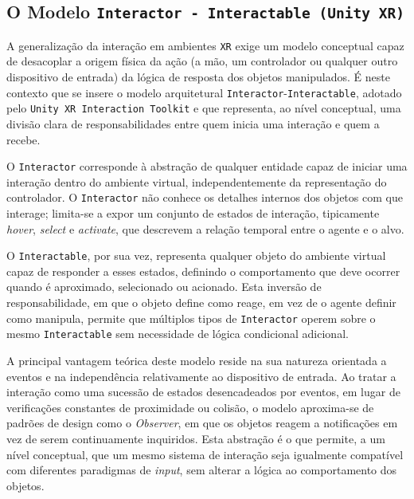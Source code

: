 \documentclass[a4paper, 12pt]{book}
\begin{document}
\subsection{O Modelo \texttt{Interactor - Interactable (Unity XR)}}
\label{subsec:interactor_interactable}
A generalização da interação em ambientes \texttt{XR} exige um modelo 
conceptual capaz de desacoplar a origem física da ação (a mão, um 
controlador ou qualquer outro dispositivo de entrada) da lógica de resposta 
dos objetos manipulados. É neste contexto que se insere o modelo 
arquitetural \texttt{Interactor}-\texttt{Interactable}, adotado pelo \texttt{Unity XR 
Interaction Toolkit} e que representa, ao nível conceptual, uma divisão 
clara de responsabilidades entre quem inicia uma interação e quem a recebe.
\par
O \texttt{Interactor} corresponde à abstração de qualquer entidade capaz de 
iniciar uma interação dentro do ambiente virtual, independentemente da representação
do controlador. O \texttt{Interactor} 
não conhece os detalhes internos dos objetos com que interage; limita-se a 
expor um conjunto de estados de interação, tipicamente \textit{hover}, 
\textit{select} e \textit{activate}, que descrevem a relação temporal entre 
o agente e o alvo.
\par
O \texttt{Interactable}, por sua vez, representa qualquer objeto do 
ambiente virtual capaz de responder a esses estados, definindo o 
comportamento que deve ocorrer quando é aproximado, selecionado ou 
acionado. Esta inversão de responsabilidade, em que o objeto define como 
reage, em vez de o agente definir como manipula, permite que múltiplos 
tipos de \texttt{Interactor} operem sobre o mesmo \texttt{Interactable} sem 
necessidade de lógica condicional adicional.
\par
A principal vantagem teórica deste modelo reside na sua natureza 
orientada a eventos e na independência relativamente ao dispositivo de 
entrada. Ao tratar a interação como uma sucessão de estados desencadeados 
por eventos, em lugar de verificações constantes de proximidade ou colisão, 
o modelo aproxima-se de padrões de design como o \textit{Observer}, em que 
os objetos reagem a notificações em vez de serem continuamente inquiridos. 
Esta abstração é o que permite, a um nível conceptual, que um 
mesmo sistema de interação seja igualmente compatível com diferentes 
paradigmas de \textit{input}, sem alterar a lógica ao 
comportamento dos objetos.
\par
\end{document}
